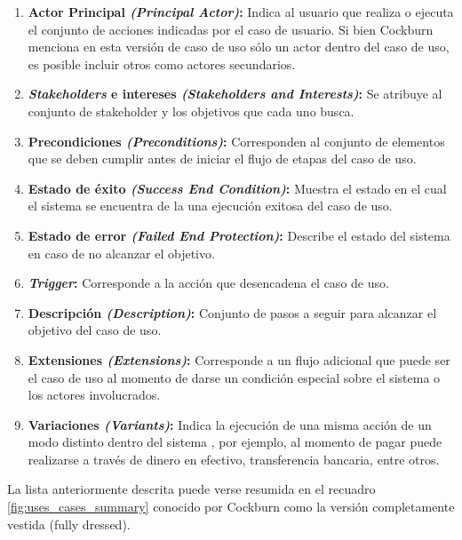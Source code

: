 \begin{enumerate}
\begin{enumerate}
      \item \textbf{Actor Principal \textit{(Principal Actor)}:} Indica al usuario que realiza o ejecuta el conjunto de acciones indicadas por el caso de usuario. Si bien Cockburn menciona en esta versión de caso de uso sólo un actor dentro del caso de uso, es posible incluir otros como actores secundarios.
      \item \textbf{\textit{Stakeholders} e intereses \textit{(Stakeholders and Interests)}:} Se atribuye al conjunto de stakeholder y los objetivos que cada uno busca.
      \item \textbf{Precondiciones \textit{(Preconditions)}:} Corresponden al conjunto de elementos que se deben cumplir antes de iniciar el flujo de etapas del caso de uso.
      \item \textbf{Estado de éxito \textit{(Success End Condition)}:} Muestra el estado en el cual el sistema se encuentra de la una ejecución exitosa del caso de uso.
      \item \textbf{Estado de error \textit{(Failed End Protection)}:} Describe el estado del sistema en caso de no alcanzar el objetivo.
      \item \textbf{\textit{Trigger}:} Corresponde a la acción que desencadena  el caso de uso.
      \item \textbf{Descripción \textit{(Description)}:} Conjunto de pasos a seguir para alcanzar el objetivo del caso de uso.
      \item \textbf{Extensiones \textit{(Extensions)}:} Corresponde a un flujo adicional que puede ser el caso de uso al momento de darse un condición especial sobre el sistema o los actores involucrados.
      \item \textbf{Variaciones \textit{(Variants)}:} Indica la ejecución de una misma acción de un modo distinto dentro del sistema , por ejemplo, al momento de pagar puede realizarse a través de dinero en efectivo, transferencia bancaria, entre otros.
    \end{enumerate}
\end{enumerate}

La lista anteriormente descrita puede verse resumida en el recuadro \ref{fig:uses_cases_summary} conocido por Cockburn \cite{uses_cases_writing} como la versión completamente vestida (fully dressed).

